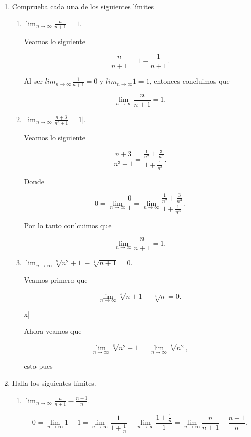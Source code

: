 \documentclass[letterpaper]{article}
\theoremstyle{definition}
\theoremstyle{lemathm}
\theoremstyle{lemademthm}
\begin{document}
    \begin{enumerate}
        
        \item Comprueba cada una de los siguientes límites
		
		\begin{enumerate}
			\item $\lim_{n\to\infty} \frac{n}{n+1} = 1$.
			
			Veamos lo siguiente

			\[\frac{n}{n+1} = 1 - \frac{1}{n + 1}.\]

			Al ser $lim_{n\to\infty}\frac{1}{n + 1} = 0$ y $lim_{n\to\infty} 1 = 1$, entonces concluimos que

			\[\lim_{n\to\infty}\frac{n}{n+1} = 1.\]

			\item $\lim_{n\to\infty} \frac{n+3}{n^3+1} = 1|$.
			
			Veamos lo siguiente

			\[\frac{n+3}{n^3+1} = \frac{\frac{1}{n^2}+\frac{3}{n^3}}{1 + \frac{1}{n^3}}.\]

			Donde

			\[0 = \lim_{n\to\infty} \frac{0}{1} = \lim_{n\to\infty} \frac{\frac{1}{n^2}+\frac{3}{n^3}}{1 + \frac{1}{n^3}}.\]

			Por lo tanto conlcuimos que

			\[\lim_{n\to\infty}\frac{n}{n+1} = 1.\]

			\item $\lim_{n\to\infty} \sqrt[8]{n^2+1} - \sqrt[4]{n + 1} = 0$.
			
			Veamos primero que

			\[\lim_{n\to\infty} \sqrt[4]{n + 1} - \sqrt[4]{n} = 0.\]

			x|

			Ahora veamos que

			\[\lim_{n\to\infty} \sqrt[8]{n^2 + 1} = \lim_{n\to\infty} \sqrt[8]{n^2},\]

			esto pues 

		\end{enumerate}

		\item Halla los siguientes límites.
		
		\begin{enumerate}
			\item $\lim_{n\to\infty} \frac{n}{n+1} - \frac{n+1}{n}$.

			\[0 = \lim_{n\to\infty} 1 - 1 = \lim_{n\to\infty} \frac{1}{1 + \frac{1}{n}} - \lim_{n\to\infty} \frac{1 + \frac{1}{n}}{1} = \lim_{n\to\infty} \frac{n}{n+1} - \frac{n+1}{n}.\]


\end{enumerate}
\end{enumerate}
\end{document}
